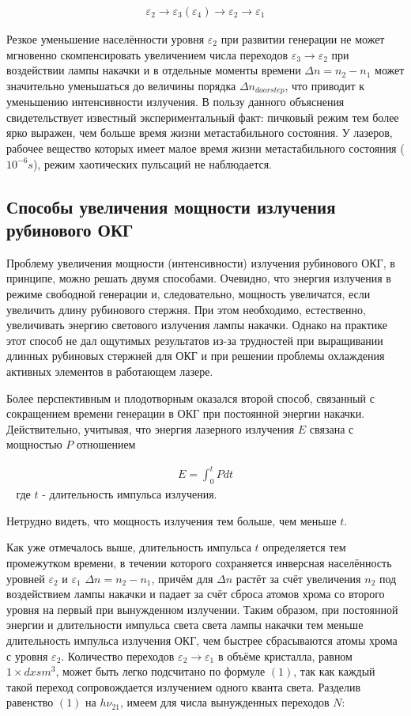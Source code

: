 \documentclass[a4paper,14pt,russian]{article}
\begin{document}
\begin{eqnarray}
\varepsilon_2 \to \varepsilon_3 (\varepsilon_4) \to \varepsilon_2 \to \varepsilon_1
\end{eqnarray}

Резкое уменьшение населённости уровня $\varepsilon_2$ при развитии генерации не может мгновенно скомпенсировать увеличением числа переходов $\varepsilon_3 \to \varepsilon_2$ при воздействии лампы накачки и в отдельные моменты времени $\Delta n = n_2 - n_1$ может значительно уменьшаться до величины порядка $\Delta n_{doorstep}$, что приводит к уменьшению интенсивности излучения. В пользу данного объяснения свидетельствует известный экспериментальный факт: пичковый режим тем более ярко выражен, чем больше время жизни метастабильного состояния. У лазеров, рабочее вещество которых имеет малое время жизни метастабильного состояния ($10^{-6} s$), режим хаотических пульсаций не наблюдается.

\subsection {Способы увеличения мощности излучения рубинового ОКГ}

Проблему увеличения мощности (интенсивности) излучения рубинового ОКГ, в принципе, можно решать двумя способами. Очевидно, что энергия излучения в режиме свободной генерации и, следовательно, мощность увеличатся, если увеличить длину рубинового стержня. При этом необходимо, естественно, увеличивать энергию светового излучения лампы накачки. Однако на практике этот способ не дал ощутимых результатов из-за трудностей при выращивании длинных рубиновых стержней для ОКГ и при решении проблемы охлаждения активных элементов в работающем лазере.

Более перспективным и плодотворным оказался второй способ, связанный с сокращением времени генерации в ОКГ при постоянной энергии накачки. Действительно, учитывая, что энергия лазерного излучения $E$ связана с мощностью $P$ отношением

\begin{eqnarray}
E = \int_0^t P dt
\end{eqnarray}
$\;\;$ где $t$ - длительность импульса излучения.

Нетрудно видеть, что мощность излучения тем больше, чем меньше $t$.

Как уже отмечалось выше, длительность импульса $t$ определяется тем промежутком времени, в течении которого сохраняется инверсная населённость уровней $\varepsilon_2$ и $\varepsilon_1$ $\Delta n = n_2 - n_1$, причём для $\Delta n$ растёт за счёт увеличения $n_2$ под воздействием лампы накачки и падает за счёт сброса атомов хрома со второго уровня на первый при вынужденном излучении. Таким образом, при постоянной энергии и длительности импульса света света лампы накачки тем меньше длительность импульса излучения ОКГ, чем быстрее сбрасываются атомы хрома с уровня $\varepsilon_2$. Количество переходов $\varepsilon_2 \to \varepsilon_1$ в объёме кристалла, равном $1 \times dx sm^3$, может быть легко подсчитано по формуле $(1)$, так как каждый такой переход сопровождается излучением одного кванта света. Разделив равенство $(1)$ на $h \nu_{21}$, имеем для числа вынужденных переходов $N$:
\end{document}
